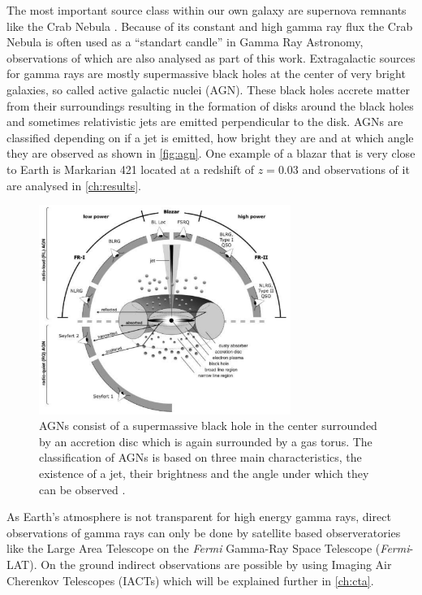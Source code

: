 The most important source class within our own galaxy are supernova remnants like the Crab Nebula \cite{nuimeprn12618}. 
Because of its constant and high gamma ray flux the Crab Nebula is often used as a \enquote{standart candle} in Gamma Ray Astronomy, observations of which are also 
analysed as part of this work.
Extragalactic sources for gamma rays are mostly supermassive black holes at the center of very bright galaxies, so called active galactic nuclei (AGN).
These black holes accrete matter from their surroundings resulting in the formation of disks around the black holes and sometimes relativistic jets are emitted 
perpendicular to the disk.
AGNs are classified depending on if a jet is emitted, how bright they are and at which angle they are observed as shown in \autoref{fig:agn}.
One example of a blazar that is very close to Earth is Markarian 421 located at a redshift of $z = \num{0.03}$ \cite{Albert_2007} and observations of it are analysed in 
\autoref{ch:results}.
\begin{figure}
    \centering
    \includegraphics[width=0.73\textwidth]{images/agn.png}
    \caption{AGNs consist of a supermassive black hole in the center surrounded by an accretion disc which is again surrounded by a gas torus.
        The classification of AGNs is based on three main characteristics, the existence of a jet, their brightness and the angle under which they can be observed \cite{doi:10.1002/9783527666829.ch4}.
    }
    \label{fig:agn}
\end{figure}


As Earth's atmosphere is not transparent for high energy gamma rays, direct observations of gamma rays can only be done by satellite based observeratories 
like the Large Area Telescope on the \textit{Fermi} Gamma-Ray Space Telescope (\textit{Fermi}-LAT).
On the ground indirect observations are possible by using Imaging Air Cherenkov Telescopes (IACTs) which will be explained further in \autoref{ch:cta}.
